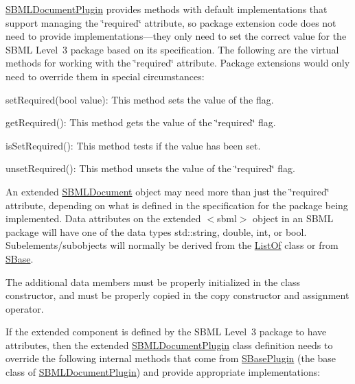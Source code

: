 \hyperlink{class_s_b_m_l_document_plugin}{S\+B\+M\+L\+Document\+Plugin} provides methods with default implementations that support managing the \char`\"{}required\char`\"{} attribute, so package extension code does not need to provide implementations---they only need to set the correct value for the S\+B\+ML Level~3 package based on its specification. The following are the virtual methods for working with the \char`\"{}required\char`\"{} attribute. Package extensions would only need to override them in special circumstances\+:

\begin{DoxyItemize}
\item {\ttfamily set\+Required(bool value)}\+: This method sets the value of the flag.\end{DoxyItemize}
\begin{DoxyItemize}
\item {\ttfamily get\+Required()}\+: This method gets the value of the \char`\"{}required\char`\"{} flag.\end{DoxyItemize}
\begin{DoxyItemize}
\item {\ttfamily is\+Set\+Required()}\+: This method tests if the value has been set.\end{DoxyItemize}
\begin{DoxyItemize}
\item {\ttfamily unset\+Required()}\+: This method unsets the value of the \char`\"{}required\char`\"{} flag.\end{DoxyItemize}


An extended \hyperlink{class_s_b_m_l_document}{S\+B\+M\+L\+Document} object may need more than just the \char`\"{}required\char`\"{} attribute, depending on what is defined in the specification for the package being implemented. Data attributes on the extended {\ttfamily $<$sbml$>$} object in an S\+B\+ML package will have one of the data types {\ttfamily std\+::string}, {\ttfamily double}, {\ttfamily int}, or {\ttfamily bool}. Subelements/subobjects will normally be derived from the \hyperlink{class_list_of}{List\+Of} class or from \hyperlink{class_s_base}{S\+Base}.

The additional data members must be properly initialized in the class constructor, and must be properly copied in the copy constructor and assignment operator.

If the extended component is defined by the S\+B\+ML Level~3 package to have attributes, then the extended \hyperlink{class_s_b_m_l_document_plugin}{S\+B\+M\+L\+Document\+Plugin} class definition needs to override the following internal methods that come from \hyperlink{class_s_base_plugin}{S\+Base\+Plugin} (the base class of \hyperlink{class_s_b_m_l_document_plugin}{S\+B\+M\+L\+Document\+Plugin}) and provide appropriate implementations\+:

